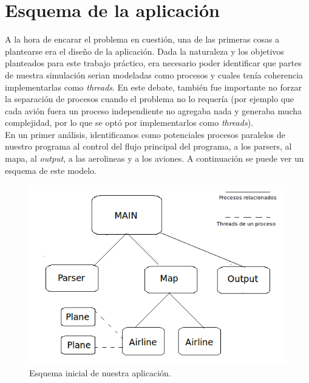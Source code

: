 \documentclass[a4paper,10pt]{article}
\begin{document}
\newpage
\section{Esquema de la aplicación}

A la hora de encarar el problema en cuestión, una de las primeras cosas a plantearse era el diseño de la aplicación. Dada la naturaleza y los objetivos planteados para este
 trabajo práctico, era necesario poder identificar que partes de nuestra simulación serian modeladas como procesos y cuales tenía coherencia implementarlas como \textit{threads}.
  En este debate, también fue importante no forzar la separación de procesos cuando el problema no lo requería (por ejemplo que cada avión fuera un proceso independiente no agregaba 
  nada y generaba mucha complejidad, por lo que se optó por implementarlos como \textit{threads}).\\ 

En un primer análisis, identificamos como potenciales procesos paralelos de nuestro programa al control del flujo principal del programa, a los parsers, al mapa, al \textit{output},
 a las aerolineas y
 a los aviones. A continuación se puede ver un esquema de este modelo.\\

\begin{figure}[H]
\begin{center}
 \includegraphics[scale=0.6]{./images/Diagrama_simulacion_2.png}
 \caption{Esquema inicial de nuestra aplicación.}
\end{center}
\end{figure}
\end{document}
